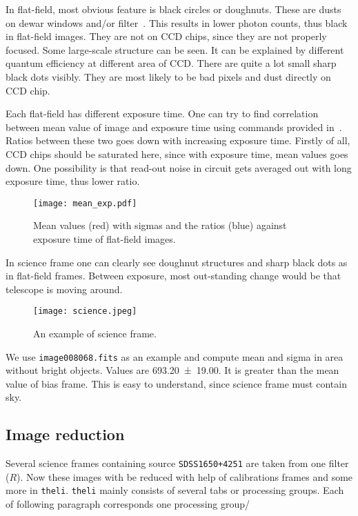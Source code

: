 In flat-field, most obvious feature is black circles or doughnuts. These are dusts on dewar windows and/or filter~\cite{manual}. This results in lower photon counts, thus black in flat-field images. They are not on CCD chips, since they are not properly focused. Some large-scale structure can be seen. It can be explained by different quantum efficiency at different area of CCD. There are quite a lot small sharp black dots visibly. They are most likely to be bad pixels and dust directly on CCD chip.

Each flat-field has different exposure time. One can try to find correlation between mean value of image and exposure time using commands provided in~\cite{manual}. Ratios between these two goes down with increasing exposure time. Firstly of all, CCD chips should be saturated here, since with exposure time, mean values goes down. One possibility is that read-out noise in circuit gets averaged out with long exposure time, thus lower ratio.
\begin{figure}[H]
   \centering
   \texttt{[image: mean\_exp.pdf]}
   \caption{Mean values (red) with sigmas and the ratios (blue) against exposure time of flat-field images.}%
\end{figure}

In science frame one can clearly see doughnut structures and sharp black dots as in flat-field frames. Between exposure, most out-standing change would be that telescope is moving around. 
\begin{figure}[H]
   \centering
   \texttt{[image: science.jpeg]}
   \caption{An example of science frame.}%
   \label{fig:science}
\end{figure}

We use \verb|image008068.fits| as an example and compute mean and sigma in area without bright objects. Values are \num{693.20 +- 19.00}. It is greater than the mean value of bias frame. This is easy to understand, since science frame must contain sky. 

\subsection{Image reduction}
Several science frames containing source \verb|SDSS1650+4251|  are taken from one filter ($R$). Now these images with be reduced with help of calibrations frames and some more in \verb|theli|. \verb|theli| mainly consists of several tabs or processing groups. Each of following paragraph corresponds one processing group/

